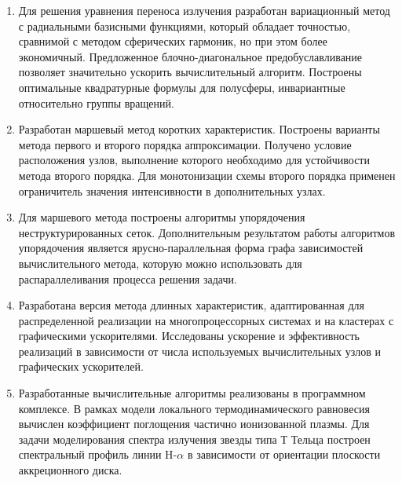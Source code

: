 \begin{enumerate}
  \item Для решения уравнения переноса излучения разработан вариационный метод с радиальными базисными функциями, который обладает точностью, сравнимой с методом сферических гармоник, но при этом более экономичный. Предложенное блочно-диагональное предобуславливание позволяет значительно ускорить вычислительный алгоритм. Построены оптимальные квадратурные формулы для полусферы, инвариантные относительно группы вращений.
  \item Разработан маршевый метод коротких характеристик. Построены варианты метода первого и второго порядка аппроксимации. Получено условие расположения узлов, выполнение которого необходимо для устойчивости метода второго порядка. Для монотонизации схемы второго порядка применен ограничитель значения интенсивности в дополнительных узлах.
  \item Для маршевого метода построены алгоритмы упорядочения неструктурированных сеток. Дополнительным результатом работы алгоритмов упорядочения является ярусно-параллельная форма графа зависимостей вычислительного метода, которую можно использовать для распараллеливания процесса решения задачи. 
  \item Разработана версия метода длинных характеристик, адаптированная для распределенной реализации на многопроцессорных системах и на кластерах с графическими ускорителями. Исследованы ускорение и эффективность реализаций в зависимости от числа используемых вычислительных узлов и графических ускорителей.
  \item Разработанные вычислительные алгоритмы реализованы в программном комплексе. В рамках модели локального термодинамического равновесия вычислен коэффициент поглощения частично ионизованной плазмы. Для задачи моделирования спектра излучения звезды типа Т Тельца построен спектральный профиль линии H-$\alpha$ в зависимости от ориентации плоскости аккреционного диска.
\end{enumerate}
